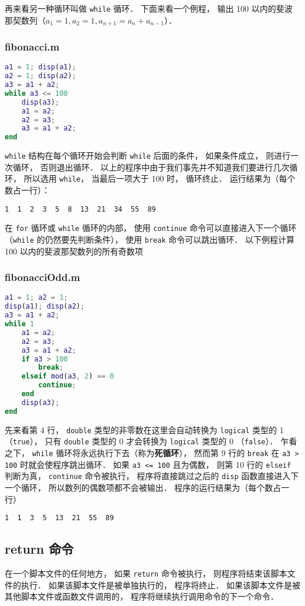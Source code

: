 再来看另一种循环叫做 \lstinline|while| 循环． 下面来看一个例程， 输出 100 以内的斐波那契数列（$a_1 = 1, a_2 = 1, a_{n+1} = a_{n} + a_{n-1}$）．

\subsubsection{fibonacci.m}
\begin{lstlisting}[language=matlab]
a1 = 1; disp(a1); 
a2 = 1; disp(a2);
a3 = a1 + a2;
while a3 <= 100
    disp(a3);
    a1 = a2;
    a2 = a3;
    a3 = a1 + a2;
end
\end{lstlisting}

\lstinline|while| 结构在每个循环开始会判断 \lstinline|while| 后面的条件， 如果条件成立， 则进行一次循环， 否则退出循环． 以上的程序中由于我们事先并不知道我们要进行几次循环， 所以选用 \lstinline|while|， 当最后一项大于 100 时， 循环终止． 运行结果为（每个数占一行）：
\begin{lstlisting}[language=matlabC]
1  1  2  3  5  8  13  21  34  55  89
\end{lstlisting}

在 \lstinline|for| 循环或 \lstinline|while| 循环的内部， 使用 \lstinline|continue| 命令可以直接进入下一个循环（\lstinline|while| 的仍然要先判断条件）， 使用 \lstinline|break| 命令可以跳出循环． 以下例程计算 100 以内的斐波那契数列的所有奇数项

\subsubsection{fibonacciOdd.m}
\begin{lstlisting}[language=matlab]
a1 = 1; a2 = 1;
disp(a1); disp(a2);
a3 = a1 + a2;
while 1
    a1 = a2;
    a2 = a3;
    a3 = a1 + a2;
    if a3 > 100
        break;
    elseif mod(a3, 2) == 0
        continue;
    end
    disp(a3);
end
\end{lstlisting}

先来看第 4 行， \lstinline|double| 类型的非零数在这里会自动转换为 \lstinline|logical| 类型的 1 （\lstinline|true|）， 只有 \lstinline|double| 类型的 0 才会转换为 \lstinline|logical| 类型的 0 （\lstinline|false|）． 乍看之下， \lstinline|while| 循环将永远执行下去（称为\textbf{死循环}）， 然而第 9 行的 \lstinline|break| 在 \lstinline|a3 > 100| 时就会使程序跳出循环． 如果 \lstinline|a3 <= 100| 且为偶数， 则第 10 行的 \lstinline|elseif| 判断为真， \lstinline|continue| 命令被执行， 程序将直接跳过之后的 \lstinline|disp| 函数直接进入下一个循环， 所以数列的偶数项都不会被输出． 程序的运行结果为（每个数占一行）
\begin{lstlisting}[language=matlabC]
1  1  3  5  13  21  55  89
\end{lstlisting}

\subsection{return 命令}
在一个脚本文件的任何地方， 如果 \lstinline|return| 命令被执行， 则程序将结束该脚本文件的执行． 如果该脚本文件是被单独执行的， 程序将终止． 如果该脚本文件是被其他脚本文件或函数文件调用的， 程序将继续执行调用命令的下一个命令．



